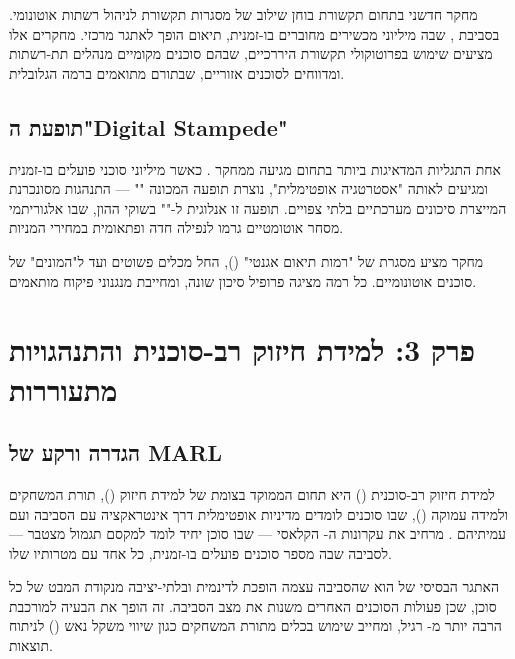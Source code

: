 \documentclass[12pt,a4paper]{article}
\begin{document}
מחקר חדשני בתחום תקשורת  \cite{Medium_Masood2024} בוחן שילוב של מסגרות תקשורת  לניהול רשתות אוטונומי. בסביבת , שבה מיליוני מכשירים מחוברים בו-זמנית, תיאום  הופך לאתגר מרכזי. מחקרים אלו מציעים שימוש בפרוטוקולי תקשורת היררכיים, שבהם סוכנים מקומיים מנהלים תת-רשתות ומדווחים לסוכנים אזוריים, שבתורם מתואמים ברמה הגלובלית.

\subsection{תופעת ה"Digital Stampede"}

אחת התגליות המדאיגות ביותר בתחום  מגיעה ממחקר  \cite{MIT_Media2025}. כאשר מיליוני סוכני  פועלים בו-זמנית ומגיעים לאותה "אסטרטגיה אופטימלית", נוצרת תופעה המכונה "" --- התנהגות מסונכרנת המייצרת סיכונים מערכתיים בלתי צפויים. תופעה זו אנלוגית ל-"" בשוקי ההון, שבו אלגוריתמי מסחר אוטומטיים גרמו לנפילה חדה ופתאומית במחירי המניות.

מחקר  מציע מסגרת של "רמות תיאום אגנטי" (), החל מכלים פשוטים ועד ל"המונים" של סוכנים אוטונומיים. כל רמה מציגה פרופיל סיכון שונה, ומחייבת מנגנוני פיקוח מותאמים.

\newpage

\section{פרק 3: למידת חיזוק רב-סוכנית והתנהגויות מתעוררות}

\subsection{הגדרה ורקע של MARL}

למידת חיזוק רב-סוכנית () היא תחום הממוקד בצומת של למידת חיזוק (), תורת המשחקים ולמידה עמוקה (), שבו סוכנים לומדים מדיניות אופטימלית דרך אינטראקציה עם הסביבה ועם עמיתיהם \cite{Medium_Felix2024}.  מרחיב את עקרונות ה- הקלאסי --- שבו סוכן יחיד לומד למקסם תגמול מצטבר --- לסביבה שבה מספר סוכנים פועלים בו-זמנית, כל אחד עם מטרותיו שלו.

האתגר הבסיסי של  הוא שהסביבה עצמה הופכת לדינמית ובלתי-יציבה מנקודת המבט של כל סוכן, שכן פעולות הסוכנים האחרים משנות את מצב הסביבה. זה הופך את הבעיה למורכבת הרבה יותר מ- רגיל, ומחייב שימוש בכלים מתורת המשחקים כגון שיווי משקל נאש () לניתוח תוצאות.
\end{document}
